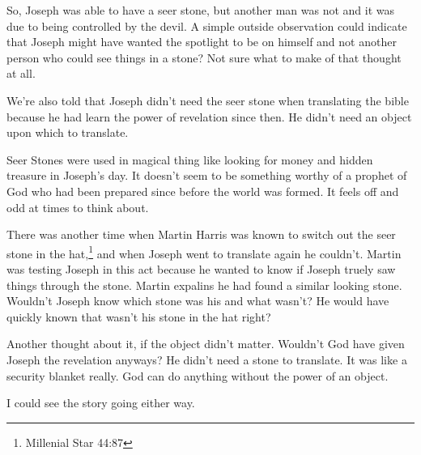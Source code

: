 So, Joseph was able to have a seer stone, but another man was not and it was due to
being controlled by the devil. A simple outside observation could indicate that
Joseph might have wanted the spotlight to be on himself and not another person who
could see things in a stone? Not sure what to make of that thought at all.

We're also told that Joseph didn't need the seer stone when translating the bible
because he had learn the power of revelation since then. He didn't need an object
upon which to translate.

Seer Stones were used in magical thing like looking for money and hidden treasure in
Joseph's day. It doesn't seem to be something worthy of a prophet of God who had been
prepared since before the world was formed. It feels off and odd at times to think
about.

There was another time when Martin Harris was known to switch out the seer stone in 
the hat,\footnote{Millenial Star 44:87} and when Joseph went to translate again he 
couldn't. Martin was testing Joseph in this act because he wanted to know if Joseph 
truely saw things through the stone. Martin expalins he had found a similar looking 
stone. Wouldn't Joseph know which stone was his and what wasn't? He would have 
quickly known that wasn't his stone in the hat right?

Another thought about it, if the object didn't matter. Wouldn't God have given Joseph
the revelation anyways? He didn't need a stone to translate. It was like a security
blanket really. God can do anything without the power of an object.

I could see the story going either way.